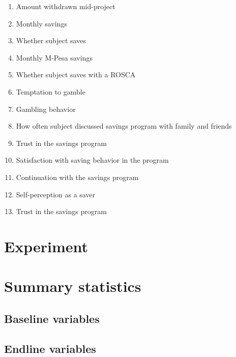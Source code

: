 \documentclass[10pt]{article}
\begin{document}
		\begin{enumerate}
		\item Amount withdrawn mid-project
		\item Monthly savings
		\item Whether subject saves
		\item Monthly M-Pesa savings
		\item Whether subject saves with a ROSCA
		\item Temptation to gamble
		\item Gambling behavior
		\item How often subject discussed savings program with family and friends
		\item Trust in the savings program
		\item Satisfaction with saving behavior in the program
		\item Continuation with the savings program
		\item Self-perception as a saver
		\item Trust in the savings program
		\end{enumerate}

\section{Experiment}

	\clearpage

\section{Summary statistics}

	\subsection{Baseline variables}

		
		
		
		
		

	\clearpage

	\subsection{Endline variables}

		
		
		
		
		
		
\end{document}
